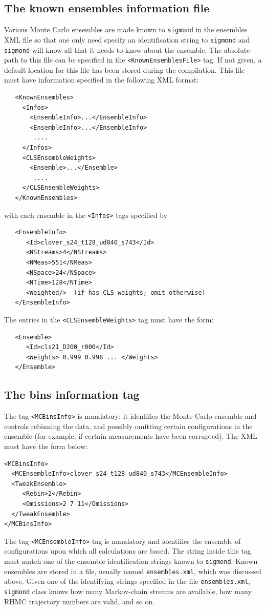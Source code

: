 \documentclass[12pt]{article}
\newcommand{\vb}{\texttt}
\begin{document}
\subsection{The known ensembles information file}
Various Monte Carlo ensembles are made known to \vb{sigmond} in the 
ensembles XML file so that one only need specify an identification
string to \vb{sigmond} and \vb{sigmond} will know all that it needs to
know about the ensemble.  The absolute path to this file can be specified in
the \vb{<KnownEnsemblesFile>} tag.  If not given, a default location
for this file has been stored during the compilation.  This file must have 
information specified in the following XML format:
\begin{verbatim}
   <KnownEnsembles>
     <Infos>
       <EnsembleInfo>...</EnsembleInfo>
       <EnsembleInfo>...</EnsembleInfo>
        ....
     </Infos>
     <CLSEnsembleWeights>
       <Ensemble>...</Ensemble>
        ....
     </CLSEnsembleWeights>
   </KnownEnsembles>
\end{verbatim}
with each ensemble in the \vb{<Infos>} tags specified by
\begin{verbatim}
   <EnsembleInfo>
      <Id>clover_s24_t128_ud840_s743</Id>
      <NStreams>4</NStreams>
      <NMeas>551</NMeas>
      <NSpace>24</NSpace>
      <NTime>128</NTime>
      <Weighted/>  (if has CLS weights; omit otherwise)
   </EnsembleInfo>
\end{verbatim}
The entries in the \vb{<CLSEnsembleWeights>} tag must have the form:
\begin{verbatim}
   <Ensemble>
      <Id>cls21_D200_r000</Id>
      <Weights> 0.999 0.998 ... </Weights>
   </Ensemble>
\end{verbatim}

\subsection{The bins information tag}

The tag \vb{<MCBinsInfo>} is mandatory: it identifies the Monte Carlo
ensemble and controls rebinning the data,
and possibly omitting certain configurations in the ensemble (for example,
if certain measurements have been corrupted).  The XML must have the form
below:
\begin{verbatim}
<MCBinsInfo>
  <MCEnsembleInfo>clover_s24_t128_ud840_s743</MCEnsembleInfo>
  <TweakEnsemble>
     <Rebin>2</Rebin>
     <Omissions>2 7 11</Omissions>
  </TweakEnsemble>
</MCBinsInfo>
\end{verbatim}
The tag \vb{<MCEnsembleInfo>} tag is mandatory and identifies the
ensemble of configurations upon which all calculations are based.
The string inside this tag must match one of the ensemble identification
strings known to \vb{sigmond}.  Known ensembles are stored in a file,
usually named \texttt{ensembles.xml}, which was discussed above.  
Given one of the identifying strings specified in the file \texttt{ensembles.xml}, 
\vb{sigmond} class knows how many
Markov-chain streams are available, how many RHMC trajectory numbers are
valid, and so on.
\end{document}
